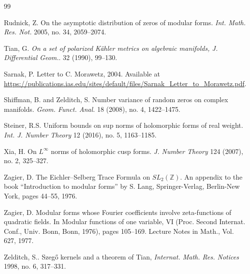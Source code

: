 \documentclass[12pt, a4paper]{amsart}
\theoremstyle{definition}
\newcommand {\1} {\mathbf{1}}
\numberwithin{equation}{section}
\begin{document}
\begin{thebibliography}{99}

Rudnick, Z.
On the asymptotic distribution of zeros of modular forms.
\emph{Int. Math. Res. Not.} 2005, no. 34, 2059--2074.

 Tian, G. \emph{On a set of polarized Kähler metrics on algebraic manifolds, J. Differential Geom.}. 32 (1990), 99–130.


Sarnak, P.
Letter to C. Morawetz, 2004.
Available at \url{https://publications.ias.edu/sites/default/files/Sarnak_Letter_to_Morawetz.pdf}{}.

Shiffman, B. and Zelditch, S.
Number variance of random zeros on complex manifolds.
\emph{Geom. Funct. Anal.} 18 (2008), no. 4, 1422--1475.

Steiner, R.S.
Uniform bounds on sup norms of holomorphic forms of real weight.
\emph{Int. J. Number Theory} 12 (2016), no. 5, 1163--1185.

Xia, H.
On $L^{\infty}$ norms of holomorphic cusp forms.
\emph{J. Number Theory} 124 (2007), no. 2, 325--327.

Zagier, D.
The Eichler--Selberg Trace Formula on $SL_2 (\mathbb Z)$.
An appendix to the book ``Introduction to modular forms'' by S. Lang, Springer-Verlag, Berlin-New York, pages 44--55, 1976.

Zagier, D.
Modular forms whose Fourier coefficients involve zeta-functions of quadratic fields.
In Modular functions of one variable, VI (Proc. Second Internat. Conf., Univ. Bonn, Bonn, 1976), pages 105--169.
Lecture Notes in Math., Vol. 627, 1977.

  Zelditch, S.. Szegő kernels and a theorem of Tian, \emph{Internat. Math. Res. Notices}
1998, no. 6, 317–331.


\end{thebibliography}
\end{document}
